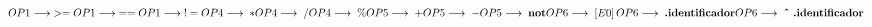 \begin{math}
    OP1 \longrightarrow \;>=\\
    OP1 \longrightarrow \;==\\
    OP1 \longrightarrow \;!=\\
    OP4 \longrightarrow \;*\\
    OP4 \longrightarrow \;/\\
    OP4 \longrightarrow \;\%\\
    OP5 \longrightarrow \;+\\
    OP5 \longrightarrow \;-\\
    OP5 \longrightarrow \;\textbf{not}\\
    OP6 \longrightarrow \;\left[E0\right]\\
    OP6 \longrightarrow \;\textbf{.identificador}\\
    OP6 \longrightarrow \;\textbf{\^\;.identificador}\\

\end{math}
